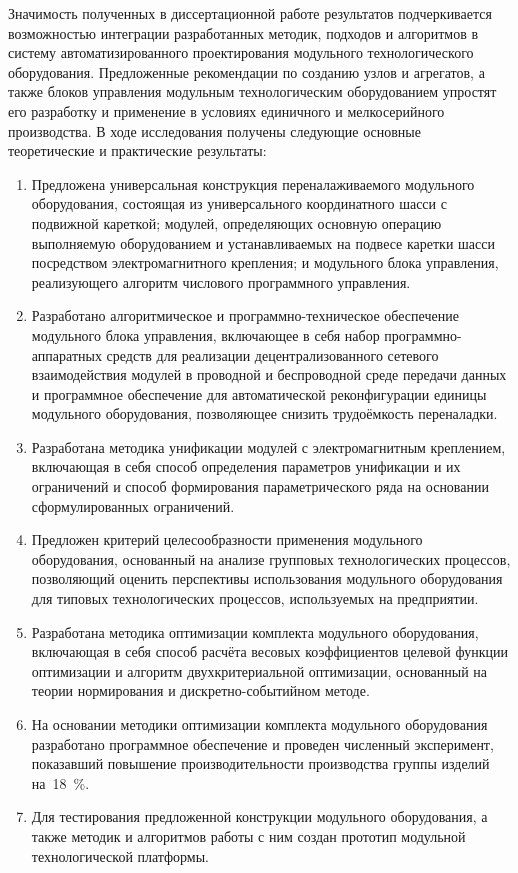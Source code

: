 
Значимость полученных в диссертационной работе результатов подчеркивается возможностью интеграции разработанных методик, подходов и алгоритмов в систему автоматизированного проектирования модульного технологического оборудования. Предложенные рекомендации по созданию узлов и агрегатов, а также блоков управления модульным технологическим оборудованием упростят его разработку и применение в условиях единичного и мелкосерийного производства.  В ходе исследования получены следующие основные теоретические и практические результаты:

\begin{enumerate}
  \item Предложена универсальная конструкция переналаживаемого модульного оборудования, состоящая из универсального координатного шасси с подвижной кареткой; модулей, определяющих основную операцию выполняемую оборудованием и устанавливаемых на подвесе каретки шасси посредством электромагнитного крепления; и модульного блока управления, реализующего алгоритм числового программного управления. 
  \item Разработано алгоритмическое и программно-техническое обеспечение модульного блока управления, включающее в себя набор программно-аппаратных средств для реализации децентрализованного сетевого взаимодействия модулей в проводной и беспроводной среде передачи данных и программное обеспечение для автоматической реконфигурации единицы модульного оборудования, позволяющее снизить трудоёмкость переналадки.  
  \item Разработана методика унификации модулей с электромагнитным креплением, включающая в себя способ определения параметров унификации и их ограничений и способ формирования параметрического ряда на основании сформулированных ограничений.
  \item Предложен критерий целесообразности применения модульного оборудования, основанный на анализе групповых технологических процессов, позволяющий оценить  перспективы использования модульного оборудования для типовых технологических процессов, используемых на предприятии.
  \item Разработана методика оптимизации комплекта модульного оборудования, включающая в себя способ расчёта весовых коэффициентов целевой функции оптимизации и алгоритм двухкритериальной оптимизации, основанный на теории нормирования и дискретно-событийном методе.
  \item На основании методики оптимизации комплекта модульного оборудования разработано программное обеспечение и проведен численный эксперимент, показавший повышение производительности производства группы изделий на~\SI{18}{\percent}.
  \item Для тестирования предложенной конструкции модульного оборудования, а также методик и алгоритмов работы с ним создан прототип модульной технологической платформы.
\end{enumerate}

